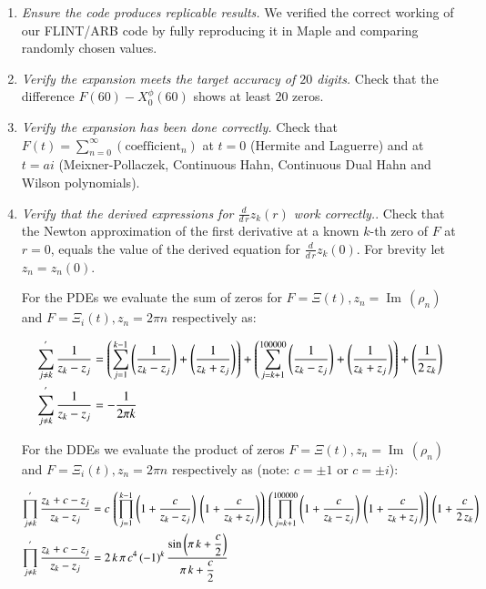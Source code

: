 \documentclass[a4paper,11pt,twoside]{amsart}
\renewcommand\Im{{\operatorname{Im\,}}}
\newcommand{\verifiedeq}{=}
\newcommand{\verifiedeq}{\stackrel{\checkmark}{=}}
\begin{document}
\begin{enumerate}
\item \textit{Ensure the code produces replicable results.} We verified the correct working of our FLINT/ARB code by fully reproducing it in Maple\texttrademark  \cite{map} and comparing randomly chosen values. 
\item  \textit{Verify the expansion meets the target accuracy of $20$ digits.} Check that the difference $F(60)-X^\phi_0(60)$ shows at least $20$ zeros.
\item  \textit{Verify the expansion has been done correctly.} Check that $F(t) \verifiedeq \sum_{n=0}^\infty (\text{coefficient}_n)$ at $t=0$ (Hermite and Laguerre) and at $t\verifiedeq ai$ (Meixner-Pollaczek, Continuous Hahn, Continuous Dual Hahn and Wilson polynomials). 
\item \textit{Verify that the derived expressions for $\frac{d}{d\,r}z_k(r)$ work correctly.}. Check that the Newton approximation of the first derivative at a known $k$-th zero of $F$ at $r=0$, equals the value of the derived equation for $\frac{d}{d\,r}z_k(0)$. For brevity let $z_n = z_n(0)$. 

For the PDEs we evaluate the sum of zeros for $F=\Xi(t), z_n=\Im(\rho_n)$ and $F=\Xi_i(t), z_n=2\pi n$ respectively as:

\begin{align}
 \sum_{j \ne k}^{'} \frac{1}{z_k-z_j} &\verifiedeq \left(\sum_{j =1}^{k-1} \left(\frac{1}{z_k-z_j}\right)+\left(\frac{1}{z_k+z_j}\right)\right) +\left(\sum_{j = k+1}^{100000} \left(\frac{1}{z_k-z_j}\right)+\left(\frac{1}{z_k+z_j}\right)\right)+\left(\frac{1}{2\,z_k} \right) \notag \\
  \sum_{j \ne k}^{'} \frac{1}{z_k-z_j} &\verifiedeq -\frac{1}{2\pi k} \notag
\end{align}

For the DDEs we evaluate the product of zeros $F\verifiedeq \Xi(t), z_n=\Im(\rho_n)$ and $F=\Xi_i(t), z_n=2\pi n$ respectively as (note: $c \verifiedeq \pm 1$ or $c =\pm i$):

\begin{align}
 \prod_{j \ne k}^{'} \frac{z_k+c-z_j}{z_k-z_j} &\verifiedeq c\,\left(\prod_{j =1}^{k-1} \left(1+\frac{c}{z_k-z_j}\right)\,\left(1+\frac{c}{z_k+z_j}\right)\right)\,\left(\prod_{j = k+1}^{100000} \left(1+\frac{c}{z_k-z_j}\right)\,\left(1+\frac{c}{z_k+z_j}\right)\right)\,\left(1+\frac{c}{2\,z_k} \right) \notag \\
 \prod_{j \ne k}^{'} \frac{z_k+c-z_j}{z_k-z_j} &\verifiedeq 2\,k\,\pi\,c^4\,(-1)^k\,\frac{\sin\left(\pi\,k+\dfrac{c}{2}\right)}{\pi\,k+\dfrac{c}{2}} \notag
\end{align}
\end{enumerate}
\end{document}
